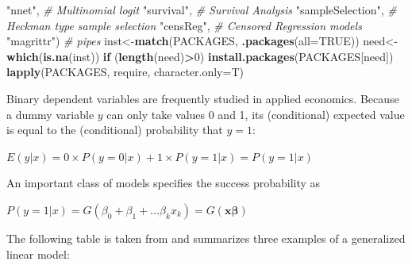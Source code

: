 \documentclass[]{book}
\newenvironment{Shaded}{\begin{snugshade}}{\end{snugshade}}
\newcommand{\CommentTok}[1]{\textcolor[rgb]{0.56,0.35,0.01}{\textit{#1}}}
\newcommand{\ControlFlowTok}[1]{\textcolor[rgb]{0.13,0.29,0.53}{\textbf{#1}}}
\newcommand{\DataTypeTok}[1]{\textcolor[rgb]{0.13,0.29,0.53}{#1}}
\newcommand{\DecValTok}[1]{\textcolor[rgb]{0.00,0.00,0.81}{#1}}
\newcommand{\KeywordTok}[1]{\textcolor[rgb]{0.13,0.29,0.53}{\textbf{#1}}}
\newcommand{\NormalTok}[1]{#1}
\newcommand{\OperatorTok}[1]{\textcolor[rgb]{0.81,0.36,0.00}{\textbf{#1}}}
\newcommand{\OtherTok}[1]{\textcolor[rgb]{0.56,0.35,0.01}{#1}}
\newcommand{\StringTok}[1]{\textcolor[rgb]{0.31,0.60,0.02}{#1}}
\begin{document}
\begin{Shaded}
\begin{Highlighting}[]
            \StringTok{"nnet"}\NormalTok{, }\CommentTok{# Multinomial logit}
            \StringTok{"survival"}\NormalTok{, }\CommentTok{# Survival Analysis}
            \StringTok{"sampleSelection"}\NormalTok{, }\CommentTok{# Heckman type sample selection}
            \StringTok{"censReg"}\NormalTok{, }\CommentTok{# Censored Regression models}
            \StringTok{"magrittr"}\NormalTok{) }\CommentTok{#  pipes}
\NormalTok{inst<-}\KeywordTok{match}\NormalTok{(PACKAGES, }\KeywordTok{.packages}\NormalTok{(}\DataTypeTok{all=}\OtherTok{TRUE}\NormalTok{))}
\NormalTok{need<-}\KeywordTok{which}\NormalTok{(}\KeywordTok{is.na}\NormalTok{(inst))}
\ControlFlowTok{if}\NormalTok{ (}\KeywordTok{length}\NormalTok{(need)}\OperatorTok{>}\DecValTok{0}\NormalTok{) }\KeywordTok{install.packages}\NormalTok{(PACKAGES[need])}
\KeywordTok{lapply}\NormalTok{(PACKAGES, require, }\DataTypeTok{character.only=}\NormalTok{T)}
\end{Highlighting}
\end{Shaded}

Binary dependent variables are frequently studied in applied economics.
Because a dummy variable \(y\) can only take values 0 and 1, its
(conditional) expected value is equal to the (conditional) probability
that \(y=1\):

\(E(y|x) = 0 \times P(y = 0|x) + 1 \times P(y = 1|x) = P(y=1|x)\)

An important class of models specifies the success probability as

\(P(y = 1 | x) = G(\beta_0 + \beta_1 + \dots \beta_k x_k) = G(\boldsymbol{x} \boldsymbol{\beta})\)

The following table is taken from \citet{dalpiaz2016} and summarizes
three examples of a generalized linear model:
\end{document}
